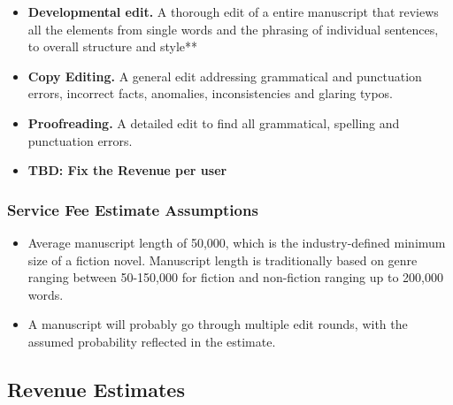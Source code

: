 \documentclass[10pt,openany]{book}
\begin{document}
\begin{itemize}
\item
  \textbf{Developmental edit.} A thorough edit of a entire manuscript
  that reviews all the elements from single words and the phrasing of
  individual sentences, to overall structure and style**
\item
  \textbf{Copy Editing.} A general edit addressing grammatical and
  punctuation errors, incorrect facts, anomalies, inconsistencies and
  glaring typos.
\item
  \textbf{Proofreading.} A detailed edit to find all grammatical,
  spelling and punctuation errors.
\item
  \textbf{TBD: Fix the Revenue per user}
\end{itemize}

\hypertarget{service-fee-estimate-assumptions}{%
\subsubsection{Service Fee Estimate
Assumptions}\label{service-fee-estimate-assumptions}}

\begin{itemize}
\item
  Average manuscript length of 50,000, which is the industry-defined
  minimum size of a fiction novel. Manuscript length is traditionally
  based on genre ranging between 50-150,000 for fiction and non-fiction
  ranging up to 200,000 words.
\item
  A manuscript will probably go through multiple edit rounds, with the
  assumed probability reflected in the estimate.
\end{itemize}

\hypertarget{revenue-estimates}{%
\subsection{Revenue Estimates}\label{revenue-estimates}}
\end{document}
